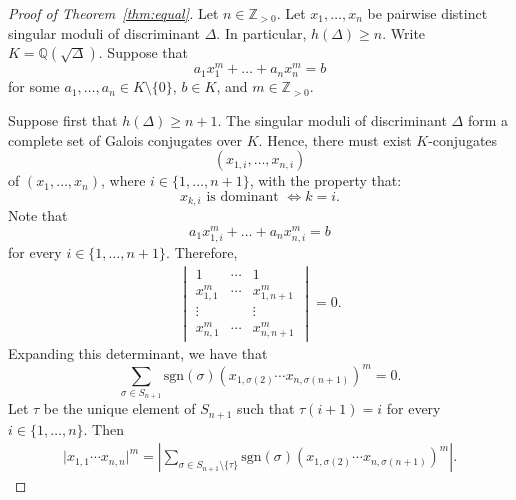 \documentclass[11pt,a4paper, british]{amsart}
\theoremstyle{definition}
\theoremstyle{remark}
\numberwithin{equation}{section}
\newcommand{\Q}{\mathbb{Q}} %
\newcommand{\Z}{\mathbb{Z}} %
\begin{document}
	
	\begin{proof}[Proof of Theorem~\ref{thm:equal}]
		Let $n \in \Z_{>0}$. Let $x_1, \ldots, x_n$ be pairwise distinct singular moduli of discriminant $\Delta$. In particular, $h(\Delta) \geq n$. Write $K = \Q(\sqrt{\Delta})$. Suppose that
		\[ a_1 x_1^m + \ldots + a_n x_n^m = b\]
		for some $a_1, \ldots, a_n \in K \setminus \{0\}$, $b \in K$, and $m \in \Z_{>0}$. 
			
			Suppose first that $h(\Delta) \geq n+1$. The singular moduli of discriminant $\Delta$ form a complete set of Galois conjugates over $K$. Hence, there must exist $K$-conjugates
			\[(x_{1, i}, \ldots, x_{n, i})\]
			of $(x_1, \ldots, x_n)$, where $i \in \{1, \ldots, n+1\}$, with the property that:
	\[x_{k, i} \mbox{ is dominant } \iff k=i.\]
	Note that
	\[a_1 x_{1, i}^m + \ldots + a_n x_{n, i}^m = b\]
	for every $i \in \{1, \ldots, n+1\}$. Therefore, 
	\begin{align*}
		\begin{vmatrix}
			1 & \cdots & 1\\
			x_{1, 1}^m & \cdots & x_{1, n+1}^m\\
			\vdots & & \vdots\\
			x_{n, 1}^m & \cdots & x_{n, n+1}^m
		\end{vmatrix}
	=0.
		\end{align*}
	Expanding this determinant, we have that
	\[ \sum_{\sigma \in S_{n+1}} \mathrm{sgn}(\sigma) (x_{1, \sigma(2)} \cdots x_{n, \sigma(n+1)})^m = 0.\]
	Let $\tau$ be the unique element of $S_{n+1}$ such that $\tau(i+1) = i$ for every $i \in \{1, \ldots, n\}$. Then
	\begin{align}\label{eq:equal1}
		\lvert x_{1, 1} \cdots x_{n, n} \rvert^m = \left \lvert \sum_{\sigma \in S_{n+1} \setminus \{ \tau\}} \mathrm{sgn}(\sigma) (x_{1, \sigma(2)} \cdots x_{n, \sigma(n+1)})^m \right\rvert.
		\end{align}
	

\end{proof}
\end{document}

